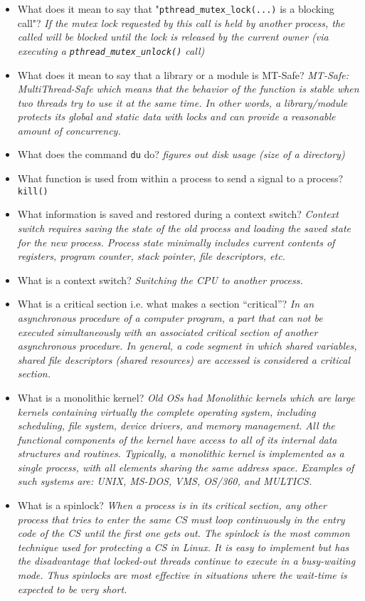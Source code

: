 \documentclass[10pt,landscape]{article}
\begin{document}
\begin{multicols}{4}
\begin{itemize}
    \item What does it mean to say that "\verb$pthread_mutex_lock(...)$ is a blocking call"?  \textit{If the mutex lock requested by this call is held by another process, the called will be blocked until the lock is released by the current owner (via executing a \texttt{pthread\_mutex\_unlock()} call)}
    \item What does it mean to say that a library or a module is MT-Safe? \textit{MT-Safe: MultiThread-Safe which means that the behavior of the function is stable when two threads try to use it at the same time. In other words, a library/module protects its global and static data with locks and can provide a reasonable amount of concurrency.}
    \item  What does the command \verb$du$ do?  \textit{figures out disk usage (size of a directory)}
    \item What function is used from within a process to send a signal to a process? \verb$kill()$
    \item What information is saved and restored during a context switch? \textit{Context switch requires saving the state of the old process and loading the saved state for the new process. Process state minimally includes current contents of registers, program counter, stack pointer, file descriptors, etc.}
    \item What is a context switch? \textit{Switching the CPU to another process.}
    \item What is a critical section i.e. what makes a section ``critical''?  \textit{In an asynchronous procedure of a computer program, a part that can not be executed simultaneously with an associated critical section of another asynchronous procedure.  In general, a code segment in which shared variables,  shared file descriptors (shared resources) are accessed is considered a critical section.}
    \item What is a monolithic kernel? \textit{Old OSs had Monolithic kernels which are large kernels containing virtually the complete operating system, including scheduling, file system, device drivers, and memory management.  All the functional components of the kernel have access to all of its internal data structures and routines.  Typically, a monolithic kernel is implemented as a single process, with all elements sharing the same address space. Examples of such systems are: UNIX, MS-DOS, VMS, OS/360, and MULTICS.}
    \item What is a spinlock?  \textit{When a process is in its critical section, any other process that tries to enter the same CS must loop continuously in the entry code of the CS until the first one gets out. The spinlock is the most common technique used for protecting a CS in Linux. It is easy to implement but has the disadvantage that locked-out threads continue to execute in a busy-waiting mode. Thus spinlocks are most effective in situations where the wait-time is expected to be very short.}
\end{itemize}


\end{multicols}
\end{document}
